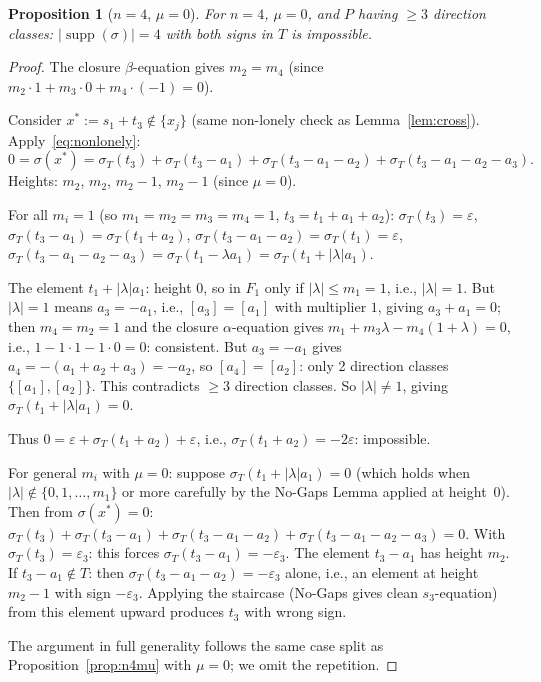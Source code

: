\documentclass{article}
\newtheorem{prop}{Proposition}
\begin{document}
\begin{prop}[$n=4$, $\mu=0$]\label{prop:n4mu0}
For $n=4$, $\mu=0$, and $P$ having $\ge 3$ direction classes:
$|\operatorname{supp}(\sigma)|=4$ with both signs in $T$ is impossible.
\end{prop}
\begin{proof}
The closure $\beta$-equation gives $m_2=m_4$ (since $m_2\cdot 1+m_3\cdot 0+m_4\cdot(-1)=0$).

Consider $x^*:=s_1+t_3\notin\{x_j\}$ (same non-lonely check as Lemma~\ref{lem:cross}).
Apply~\eqref{eq:nonlonely}:
\[
  0=\sigma(x^*)=\sigma_T(t_3)+\sigma_T(t_3-a_1)+\sigma_T(t_3-a_1-a_2)
  +\sigma_T(t_3-a_1-a_2-a_3).
\]
Heights: $m_2$, $m_2$, $m_2-1$, $m_2-1$ (since $\mu=0$).

For all $m_i=1$ (so $m_1=m_2=m_3=m_4=1$, $t_3=t_1+a_1+a_2$):
$\sigma_T(t_3)=\varepsilon$, $\sigma_T(t_3-a_1)=\sigma_T(t_1+a_2)$,
$\sigma_T(t_3-a_1-a_2)=\sigma_T(t_1)=\varepsilon$,
$\sigma_T(t_3-a_1-a_2-a_3)=\sigma_T(t_1-\lambda a_1)=\sigma_T(t_1+|\lambda|a_1)$.

The element $t_1+|\lambda|a_1$: height $0$, so in $F_1$ only if $|\lambda|\le m_1=1$,
i.e., $|\lambda|=1$.  But $|\lambda|=1$ means $a_3=-a_1$, i.e., $[a_3]=[a_1]$ with
multiplier $1$, giving $a_3+a_1=0$; then $m_4=m_2=1$ and the closure $\alpha$-equation
gives $m_1+m_3\lambda-m_4(1+\lambda)=0$, i.e., $1-1\cdot 1-1\cdot 0=0$: consistent.
But $a_3=-a_1$ gives $a_4=-(a_1+a_2+a_3)=-a_2$, so $[a_4]=[a_2]$: only 2 direction
classes $\{[a_1],[a_2]\}$.  This contradicts $\ge 3$ direction classes.
So $|\lambda|\ne 1$, giving $\sigma_T(t_1+|\lambda|a_1)=0$.

Thus $0=\varepsilon+\sigma_T(t_1+a_2)+\varepsilon$, i.e., $\sigma_T(t_1+a_2)=-2\varepsilon$:
impossible.

For general $m_i$ with $\mu=0$: suppose $\sigma_T(t_1+|\lambda|a_1)=0$
(which holds when $|\lambda|\notin\{0,1,\dots,m_1\}$ or more carefully by the No-Gaps
Lemma applied at height~$0$).  Then from $\sigma(x^*)=0$:
$\sigma_T(t_3)+\sigma_T(t_3-a_1)+\sigma_T(t_3-a_1-a_2)+\sigma_T(t_3-a_1-a_2-a_3)=0$.
With $\sigma_T(t_3)=\varepsilon_3$: this forces $\sigma_T(t_3-a_1)=-\varepsilon_3$.
The element $t_3-a_1$ has height $m_2$.  If $t_3-a_1\notin T$: then
$\sigma_T(t_3-a_1-a_2)=-\varepsilon_3$ alone, i.e., an element at height $m_2-1$
with sign $-\varepsilon_3$.  Applying the staircase (No-Gaps gives clean $s_3$-equation)
from this element upward produces $t_3$ with wrong sign.

The argument in full generality follows the same case split as
Proposition~\ref{prop:n4mu} with $\mu=0$; we omit the repetition.
\end{proof}
\end{document}
